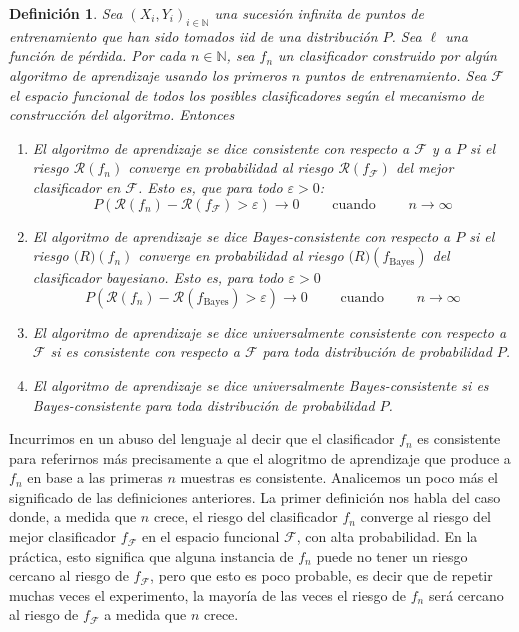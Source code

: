 \documentclass{report}
\newtheorem{dfn}{Definición}[section]
\begin{document}
\begin{dfn}
    Sea $(X_i,Y_i)_{i\in\mathbb{N}}$ una sucesión infinita de puntos de entrenamiento que han sido tomados iid de una distribución $P$.
    Sea $\ell$ una función de pérdida. Por cada $n\in \mathbb{N}$, sea $f_n$ un clasificador construido por algún algoritmo de aprendizaje
    usando los primeros $n$ puntos de entrenamiento. Sea $\mathcal{F}$ el espacio funcional de todos los posibles clasificadores según
    el mecanismo de construcción del algoritmo. Entonces
    \begin{enumerate}
    \item  El algoritmo de aprendizaje se dice \textnormal{consistente con respecto a $\mathcal{F}$ y a $P$} si el riesgo $\mathcal{R}(f_n)$
     converge en probabilidad al riesgo  $\mathcal{R}(f_{\mathcal{F}})$ del mejor clasificador en $\mathcal{F}$. Esto es,
     que para todo $\varepsilon>0$:
     \[
     P\left(\mathcal{R}(f_n)-\mathcal{R}(f_{\mathcal{F}})>\varepsilon\right) \rightarrow 0 \qquad \text{ cuando } \qquad n\rightarrow \infty
     \]
     \item  El algoritmo de aprendizaje se dice \textnormal{Bayes-consistente con respecto a $P$} si el riesgo $\mathcal(R)(f_n)$
     converge en probabilidad al riesgo  $\mathcal(R)(f_{\text{Bayes}})$ del clasificador bayesiano. Esto es, para todo $\varepsilon>0$
    \[
     P\left(\mathcal{R}(f_n)-\mathcal{R}(f_{\text{Bayes}})>\varepsilon\right) \rightarrow 0 \qquad \text{ cuando } \qquad n\rightarrow \infty
    \]
    \item  El algoritmo de aprendizaje se dice \textnormal{universalmente consistente con respecto a $\mathcal{F}$} si
    es consistente con respecto a $\mathcal{F}$ para toda distribución de probabilidad $P$.
    \item  El algoritmo de aprendizaje se dice \textnormal{universalmente Bayes-consistente } si
    es Bayes-consistente para toda distribución de probabilidad $P$.
    \end{enumerate}
    \label{def:consistencias}
\end{dfn}

Incurrimos en un abuso del lenguaje al decir que el clasificador $f_n$ es consistente para referirnos más precisamente a que
el alogritmo de aprendizaje que produce a $f_n$ en base a las primeras $n$ muestras es consistente. Analicemos un poco más el
significado de las definiciones anteriores. La primer definición nos habla del caso donde, a medida que $n$ crece, el riesgo
del clasificador $f_n$ converge al riesgo del mejor clasificador $f_{\mathcal{F}}$ en el espacio funcional $\mathcal{F}$, con alta probabilidad.
En la práctica, esto significa que alguna instancia de $f_n$ puede no tener un riesgo cercano al riesgo de $f_{\mathcal{F}}$, pero que esto es poco
probable, es decir que de repetir muchas veces el experimento, la mayoría de las veces el riesgo de $f_n$ será cercano al riesgo de $f_{\mathcal{F}}$
a medida que $n$ crece.
\end{document}
